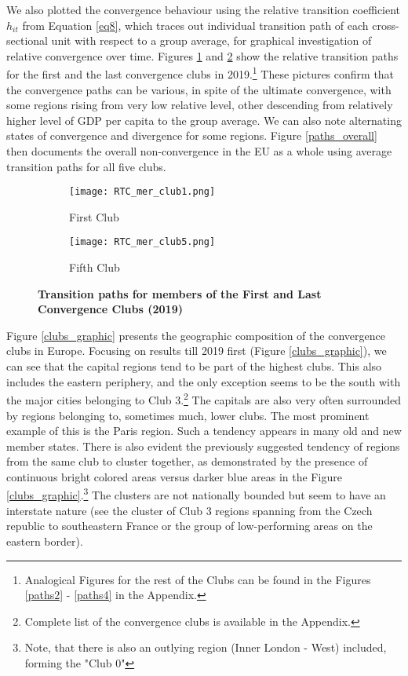 \documentclass[11pt]{article}
\begin{document}
We also plotted the convergence behaviour using the relative transition coefficient $h_{it}$ from Equation \ref{eq8}, which traces out individual transition path of each cross-sectional unit with respect to a group average, for graphical investigation of relative convergence over time. Figures \ref{paths1} and \ref{paths5} show the relative transition paths for the first and the last convergence clubs in 2019.\footnote{Analogical Figures for the rest of the Clubs can be found in the Figures \ref{paths2} - \ref{paths4} in the Appendix.} These pictures confirm that the convergence paths can be various, in spite of the ultimate convergence, with some regions rising from very low relative level, other descending from relatively higher level of GDP per capita to the group average. We can also note alternating states of convergence and divergence for some regions. Figure \ref{paths_overall} then documents the overall non-convergence in the EU as a whole using average transition paths for all five clubs.

\begin{figure}[!htbp]%
    \centering
\begin{subfigure}{0.45\textwidth}
    \centering
    \texttt{[image: RTC\_mer\_club1.png]}
    \caption{First Club}
    \label{paths1}   
\end{subfigure}\hfill
\begin{subfigure}{0.45\textwidth}
    \centering
    \texttt{[image: RTC\_mer\_club5.png]}
    \caption{Fifth Club}
    \label{paths5}
\end{subfigure}
\caption{\textbf{Transition paths for members of the First and Last Convergence Clubs (2019)}}
\label{convergence_paths}

\end{figure}


Figure \ref{clubs_graphic} presents the geographic composition of the convergence clubs in Europe. Focusing on results till 2019 first (Figure \ref{clubs_graphic}), we can see that the capital regions tend to be part of the highest clubs. This also includes the eastern periphery, and the only exception seems to be the south with the major cities belonging to Club 3.\footnote{Complete list of the convergence clubs is available in the Appendix.} The capitals are also very often surrounded by regions belonging to, sometimes much, lower clubs. The most prominent example of this is the Paris region. Such a tendency appears in many old and new member states. There is also evident the previously suggested tendency of regions from the same club to cluster together, as demonstrated by the presence of continuous bright colored areas versus darker blue areas in the Figure \ref{clubs_graphic}.\footnote{Note, that there is also an outlying region (Inner London - West) included, forming the "Club 0"} The clusters are not nationally bounded but seem to have an interstate nature (see the cluster of Club 3 regions spanning from the Czech republic to southeastern France or the group of low-performing areas on the eastern border).
\end{document}
